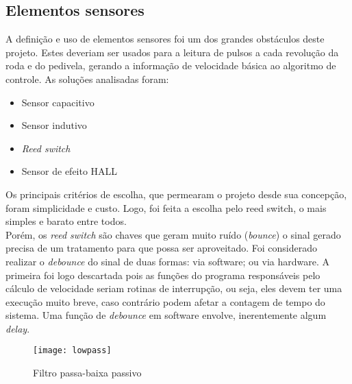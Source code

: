 \documentclass[a4paper,11pt]{article}
\begin{document}
\subsection{Elementos sensores}
\label{sensores}
A definição e uso de elementos sensores foi um dos grandes obstáculos deste
projeto. Estes deveriam ser usados para a leitura de pulsos a cada revolução da
roda e do pedivela, gerando a informação de velocidade básica ao algoritmo de
controle. As soluções analisadas foram:
\begin{itemize}
 \item Sensor capacitivo
 \item Sensor indutivo
 \item \textit{Reed switch}
 \item Sensor de efeito HALL
\end{itemize}
Os principais critérios de escolha, que permearam o projeto desde sua concepção,
foram simplicidade e custo. Logo, foi feita a escolha pelo reed switch, o
mais simples e barato entre todos. \\
Porém, os \textit{reed switch} são chaves que geram muito ruído
(\textit{bounce}) o sinal gerado precisa de um tratamento para que possa ser
aproveitado. Foi considerado realizar o \textit{debounce} do sinal de duas
formas: via software; ou via hardware. A primeira foi logo descartada pois as
funções do programa responsáveis pelo cálculo de velocidade seriam rotinas de
interrupção, ou seja, eles devem ter uma execução muito breve, caso contrário
podem afetar a contagem de tempo do sistema. Uma função de \textit{debounce} em
software envolve, inerentemente algum \textit{delay}.\\

\begin{figure}[ht]
 \begin{center}
  \texttt{[image: lowpass]}
 \end{center}
 \caption{Filtro passa-baixa passivo}
 \label{fig:lowpass}
\end{figure}
\end{document}
